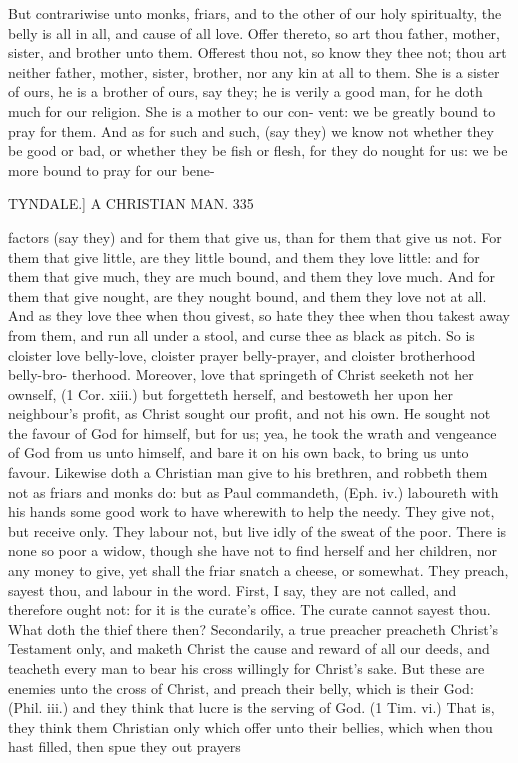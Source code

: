 \documentclass{custom}
\begin{document}
{But contrariwise unto monks, friars, and to the other of 
our holy spiritualty, the belly is all in all, and cause of all 
love. Offer thereto, so art thou father, mother, sister, and 
brother unto them. Offerest thou not, so know they thee 
not; thou art neither father, mother, sister, brother, nor 
any kin at all to them. She is a sister of ours, he is a 
brother of ours, say they; he is verily a good man, for he 
doth much for our religion. She is a mother to our con- 
vent: we be greatly bound to pray for them. And as for 
such and such, (say they) we know not whether they be 
good or bad, or whether they be fish or flesh, for they do 
nought for us: we be more bound to pray for our bene- 


TYNDALE.]
A CHRISTIAN MAN.
335

factors (say they) and for them that give us, than for them 
that give us not. For them that give little, are they little 
bound, and them they love little: and for them that give 
much, they are much bound, and them they love much. 
And for them that give nought, are they nought bound, 
and them they love not at all. And as they love thee 
when thou givest, so hate they thee when thou takest 
away from them, and run all under a stool, and curse thee 
as black as pitch. So is cloister love belly-love, cloister 
prayer belly-prayer, and cloister brotherhood belly-bro- 
therhood. Moreover, love that springeth of Christ seeketh 
not her ownself, (1 Cor. xiii.) but forgetteth herself, and 
bestoweth her upon her neighbour's profit, as Christ sought 
our profit, and not his own. He sought not the favour of 
God for himself, but for us; yea, he took the wrath and 
vengeance of God from us unto himself, and bare it on his 
own back, to bring us unto favour. Likewise doth a 
Christian man give to his brethren, and robbeth them not 
as friars and monks do: but as Paul commandeth, 
(Eph. iv.) laboureth with his hands some good work to have 
wherewith to help the needy. They give not, but receive 
only. They labour not, but live idly of the sweat of the 
poor. There is none so poor a widow, though she have 
not to find herself and her children, nor any money to give, 
yet shall the friar snatch a cheese, or somewhat. They 
preach, sayest thou, and labour in the word. First, I say, 
they are not called, and therefore ought not: for it is the 
curate's office. The curate cannot sayest thou. What 
doth the thief there then? Secondarily, a true preacher 
preacheth Christ's Testament only, and maketh Christ the 
cause and reward of all our deeds, and teacheth every man 
to bear his cross willingly for Christ's sake. But these 
are enemies unto the cross of Christ, and preach their 
belly, which is their God: (Phil. iii.) and they think that 
lucre is the serving of God. (1 Tim. vi.) That is, they 
think them Christian only which offer unto their bellies, 
which when thou hast filled, then spue they out prayers 

}
\end{document}
